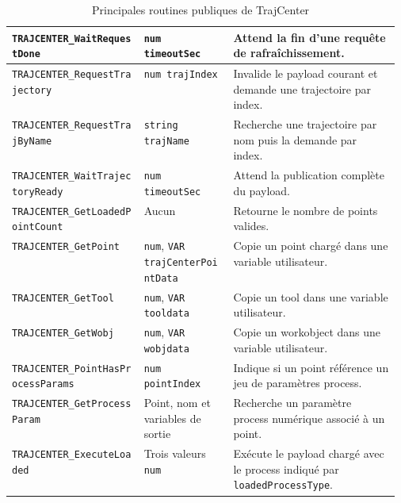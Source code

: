 \documentclass{rapportENSAM}
\begin{document}
\begin{table}[ht]
\begin{tabularx}{\linewidth}{
        |p{0.34\linewidth}
        |p{0.23\linewidth}
        |X|
    }
        \texttt{TRAJCENTER\_WaitRequestDone} &
        \texttt{num timeoutSec} &
        Attend la fin d'une requête de rafraîchissement. \\
        \hline

        \texttt{TRAJCENTER\_RequestTrajectory} &
        \texttt{num trajIndex} &
        Invalide le payload courant et demande une trajectoire par index. \\
        \hline

        \texttt{TRAJCENTER\_RequestTrajByName} &
        \texttt{string trajName} &
        Recherche une trajectoire par nom puis la demande par index. \\
        \hline

        \texttt{TRAJCENTER\_WaitTrajectoryReady} &
        \texttt{num timeoutSec} &
        Attend la publication complète du payload. \\
        \hline

        \texttt{TRAJCENTER\_GetLoadedPointCount} &
        Aucun &
        Retourne le nombre de points valides. \\
        \hline

        \texttt{TRAJCENTER\_GetPoint} &
        \texttt{num},
        \texttt{VAR trajCenterPointData} &
        Copie un point chargé dans une variable utilisateur. \\
        \hline

        \texttt{TRAJCENTER\_GetTool} &
        \texttt{num},
        \texttt{VAR tooldata} &
        Copie un tool dans une variable utilisateur. \\
        \hline

        \texttt{TRAJCENTER\_GetWobj} &
        \texttt{num},
        \texttt{VAR wobjdata} &
        Copie un workobject dans une variable utilisateur. \\
        \hline

        \texttt{TRAJCENTER\_PointHasProcessParams} &
        \texttt{num pointIndex} &
        Indique si un point référence un jeu de paramètres process. \\
        \hline

        \texttt{TRAJCENTER\_GetProcessParam} &
        Point, nom et variables de sortie &
        Recherche un paramètre process numérique associé à un point. \\
        \hline

        \texttt{TRAJCENTER\_ExecuteLoaded} &
        Trois valeurs \texttt{num} &
        Exécute le payload chargé avec le process indiqué par
        \texttt{loadedProcessType}. \\
        \hline
    \end{tabularx}
    \caption{Principales routines publiques de TrajCenter}
    \label{tab:rapid-main-routines}
\end{table}
\end{document}
